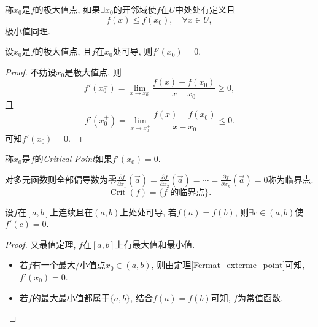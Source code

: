 
\begin{definition}
    称$x_0$是$f$的极大值点, 如果$\exists x_0$的开邻域使$f$在$U$中处处有定义且
    \begin{equation}
      f\left( x \right) \le f\left( x_0 \right) ,\quad \forall x \in U,
    \end{equation}
    极小值同理.
\end{definition}
\begin{theorem}[Fermat]\label{Fermat_exterme_point}
    设$x_0$是$f$的极大值点, 且$f$在$x_0$处可导, 则$f'\left( x_0 \right) = 0$.
\end{theorem}
\begin{proof}
    不妨设$x_0$是极大值点, 则
    \begin{equation}
      f'\left( x_0^{-} \right) = \lim_{x \to x_0^{-}} \frac{f\left( x \right) - f\left( x_0 \right) }{x-x_0} \ge 0,
    \end{equation}
    且
    \begin{equation}
      f'\left( x_0^{+} \right) = \lim_{x \to x_0^{+}} \frac{f\left( x \right) - f\left( x_0 \right) }{x-x_0} \le 0.
    \end{equation}
    可知$f'\left( x_0 \right) = 0$.
\end{proof}

\begin{definition}
    称$x_0$是$f$的\emph{Critical Point}如果$f'\left( x_0 \right) = 0$.

    对多元函数则全部偏导数为零$\frac{\partial f}{\partial x_1}\left( \vec{a} \right) = \frac{\partial f}{\partial x_2}\left( \vec{a} \right) = \cdots = \frac{\partial f}{\partial x_n} \left( \vec{a} \right) = 0$称为临界点.
    \begin{equation}
      \operatorname{Crit}\left( f \right) = \{ f\text{ 的临界点} \}.
    \end{equation}
\end{definition}

\begin{theorem}[罗尔定理]
    设$f$在$[a,b]$上连续且在$(a,b)$上处处可导, 若$f\left( a \right) = f\left( b \right) $, 则$\exists c \in (a,b)$使$f'\left( c \right) = 0$.
\end{theorem}
\begin{proof}
    又最值定理, $f$在$[a,b]$上有最大值和最小值.
    \begin{itemize}
        \item 若$f$有一个最大/小值点$x_0 \in (a,b)$, 则由定理\ref{Fermat_exterme_point}可知, $f'\left( x_0 \right) = 0$.
        \item 若$f$的最大最小值都属于$\{ a,b \}$, 结合$f\left( a \right) = f\left( b \right) $可知, $f$为常值函数.
    \end{itemize}
\end{proof}

